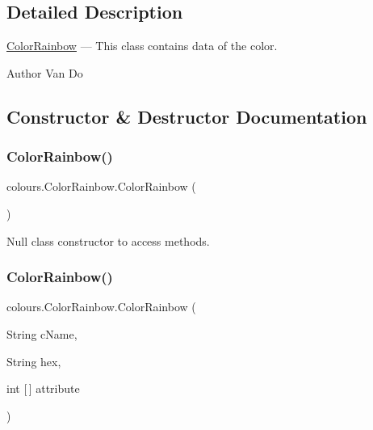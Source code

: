 \subsection{Detailed Description}
\hyperlink{classcolours_1_1_color_rainbow}{Color\+Rainbow} --- This class contains data of the color. \begin{DoxyAuthor}{Author}
Van Do 
\end{DoxyAuthor}


\subsection{Constructor \& Destructor Documentation}
\mbox{\label{classcolours_1_1_color_rainbow_a5b5afcd7b84d4ce9d9114e83952c0667}} 
\subsubsection{\texorpdfstring{Color\+Rainbow()}{ColorRainbow()}\hspace{0.1cm}{\footnotesize\ttfamily [1/2]}}
{\footnotesize\ttfamily colours.\+Color\+Rainbow.\+Color\+Rainbow (\begin{DoxyParamCaption}{ }\end{DoxyParamCaption})\hspace{0.3cm}{\ttfamily [inline]}}

Null class constructor to access methods. \mbox{\label{classcolours_1_1_color_rainbow_ae530ee141556838d725f6a234d7673e2}} 
\subsubsection{\texorpdfstring{Color\+Rainbow()}{ColorRainbow()}\hspace{0.1cm}{\footnotesize\ttfamily [2/2]}}
{\footnotesize\ttfamily colours.\+Color\+Rainbow.\+Color\+Rainbow (\begin{DoxyParamCaption}\item[{String}]{c\+Name,  }\item[{String}]{hex,  }\item[{int \mbox{[}$\,$\mbox{]}}]{attribute }\end{DoxyParamCaption})\hspace{0.3cm}{\ttfamily [inline]}}

